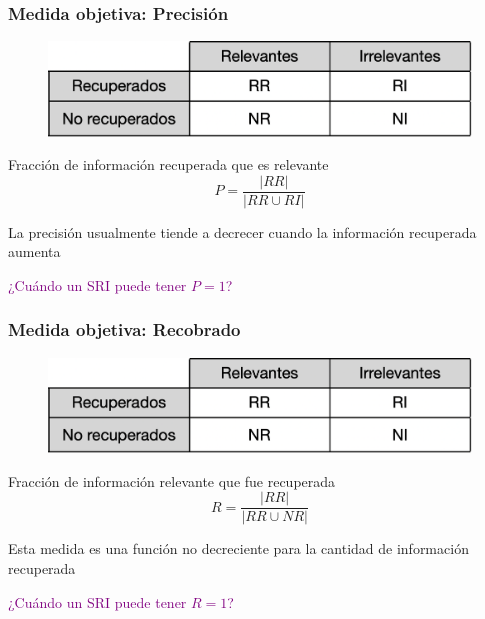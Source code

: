 \documentclass[
10pt, %
aspectratio=169, %
]{beamer}
\begin{document}
	\begin{frame}
		
		\frametitle{Medida objetiva: Precisión}
		
		\begin{figure}[tl]
			\centering
			\includegraphics[scale=0.35]{matriz-peq.png}
		\end{figure}
		
		\vspace{2\baselineskip}
		
		\centering
		Fracción de información recuperada que es relevante
		$$P = \frac{|RR|}{|RR \cup RI|}$$
		
		La precisión usualmente tiende a decrecer cuando la información recuperada aumenta
		
		\pause
		\vspace{3\baselineskip}
		\textcolor{purple}{¿Cuándo un SRI puede tener $P=1$?}
		
	\end{frame}
	
	\begin{frame}
		
		\frametitle{Medida objetiva: Recobrado}
		
		\begin{figure}[tl]
			\centering
			\includegraphics[scale=0.35]{matriz-peq.png}
		\end{figure}
		
		\vspace{2\baselineskip}
		
		\centering
		Fracción de información relevante que fue recuperada
		$$R = \frac{|RR|}{|RR \cup NR|}$$
		
		Esta medida es una función no decreciente para la cantidad de información recuperada
		
		\pause
		\vspace{3\baselineskip}
		\textcolor{purple}{¿Cuándo un SRI puede tener $R=1$?}
		
	\end{frame}
	
\end{document}
